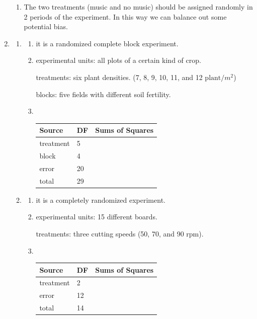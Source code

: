 \documentclass{article}
\begin{document}
\begin{enumerate}[leftmargin = 0 em, label = \arabic*., font = \bfseries]
\begin{enumerate}
\item The two treatments (music and no music) should be assigned randomly in 2 periods of the experiment. In this way we can balance out some potential bias.



		\end{enumerate}

\newpage
		\item 
\begin{enumerate}
	\item 
	\begin{enumerate}
		\item  it is a randomized complete block experiment.
		\item experimental units: all plots of a certain kind of crop.

		treatments: six plant densities. (7, 8, 9, 10, 11, and 12 $\textrm{plant}/m^2$)

		blocks: five fields with different soil fertility.


		\item \

		\begin{center}
		\begin{tabular}{lll}
		\toprule
		Source & DF & Sums of Squares\\
		\midrule
		treatment & 5 & \\
		block & 4 & \\
		error & 20 &\\
		total & 29&\\
		\bottomrule

		\end{tabular}
		\end{center}
	\end{enumerate}

	\item 
	\begin{enumerate}
		\item
	it is a completely randomized experiment.
	\item experimental units: 15 different boards.

		treatments: three cutting speeds (50, 70, and 90 rpm).


		\item \

		\begin{center}
		\begin{tabular}{lll}
		\toprule
		Source & DF & Sums of Squares\\
		\midrule
		treatment & 2 & \\
		error & 12 &\\
		total & 14&\\
		\bottomrule


\end{tabular}
\end{center}
\end{enumerate}
\end{enumerate}
\end{enumerate}
\end{document}
